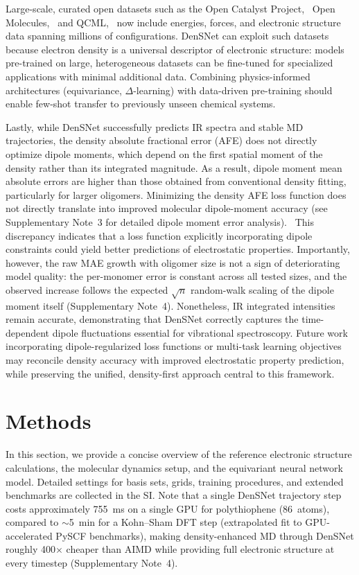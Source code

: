 \documentclass[12pt]{article}
\begin{document}
Large-scale, curated open datasets such as the Open Catalyst Project,~\cite{chanussot2021open} Open Molecules,~\cite{levine2025open} and QCML,~\cite{ganscha2025qcml} now include energies, forces, and electronic structure data spanning millions of configurations. DenSNet can exploit such datasets because electron density is a universal descriptor of electronic structure: models pre-trained on large, heterogeneous datasets can be fine-tuned for specialized applications with minimal additional data. Combining physics-informed architectures (equivariance, $\Delta$-learning) with data-driven pre-training should enable few-shot transfer to previously unseen chemical systems.

Lastly, while DenSNet successfully predicts IR spectra and stable MD trajectories, the density absolute fractional error (AFE) does not directly optimize dipole moments, which depend on the first spatial moment of the density rather than its integrated magnitude. As a result, dipole moment mean absolute errors are higher than those obtained from conventional density fitting, particularly for larger oligomers. Minimizing the density AFE loss function does not directly translate into improved molecular dipole-moment accuracy (see Supplementary Note~3 for detailed dipole moment error analysis).~\cite{wayo2025qdftnet} This discrepancy indicates that a loss function explicitly incorporating dipole constraints could yield better predictions of electrostatic properties. Importantly, however, the raw MAE growth with oligomer size is not a sign of deteriorating model quality: the per-monomer error is constant across all tested sizes, and the observed increase follows the expected $\sqrt{n}$ random-walk scaling of the dipole moment itself (Supplementary Note~4). Nonetheless, IR integrated intensities remain accurate, demonstrating that DenSNet correctly captures the time-dependent dipole fluctuations essential for vibrational spectroscopy. Future work incorporating dipole-regularized loss functions or multi-task learning objectives may reconcile density accuracy with improved electrostatic property prediction, while preserving the unified, density-first approach central to this framework.

\FloatBarrier
\section{Methods}\label{sec:methods}
In this section, we provide a concise overview of the reference electronic structure calculations, the molecular dynamics setup, and the equivariant neural network model. Detailed settings for basis sets, grids, training procedures, and extended benchmarks are collected in the SI. Note that a single DenSNet trajectory step costs approximately 755~ms on a single GPU for polythiophene (86~atoms), compared to ${\sim}$5~min for a Kohn--Sham DFT step (extrapolated fit to GPU-accelerated PySCF benchmarks), making density-enhanced MD through DenSNet roughly 400$\times$ cheaper than AIMD while providing full electronic structure at every timestep (Supplementary Note~4).
\end{document}

